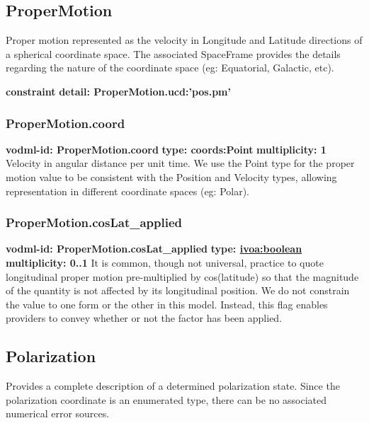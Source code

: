   \subsection{ProperMotion}
  \label{sect:ProperMotion}
    Proper motion represented as the velocity in Longitude and Latitude directions of a spherical coordinate space. The associated SpaceFrame provides the details regarding the nature of the coordinate space (eg: Equatorial, Galactic, etc).

    \noindent \textbf{constraint} \newline
    \indent    \textbf{detail: ProperMotion.ucd:'pos.pm' }\newline

    \subsubsection{ProperMotion.coord}
      \textbf{vodml-id: ProperMotion.coord} \newline
      \textbf{type: coords:Point} \newline
      \textbf{multiplicity: 1} \newline 
      Velocity in angular distance per unit time. We use the Point type for the proper motion value to be consistent with the Position and Velocity types, allowing representation in different coordinate spaces (eg: Polar).

    \subsubsection{ProperMotion.cosLat\_applied}
      \textbf{vodml-id: ProperMotion.cosLat\_applied} \newline
      \textbf{type: \hyperref[sect:ivoa]{ivoa:boolean}} \newline
      \textbf{multiplicity: 0..1} \newline 
      It is common, though not universal, practice to quote longitudinal proper motion pre-multiplied by cos(latitude) so that the magnitude of the quantity is not affected by its longitudinal position. We do not constrain the value to one form or the other in this model. Instead, this flag enables providers to convey whether or not the factor has been applied.

  \subsection{Polarization}
  \label{sect:Polarization}
    Provides a complete description of a determined polarization state. Since the polarization coordinate is an enumerated type, there can be no associated numerical error sources.

